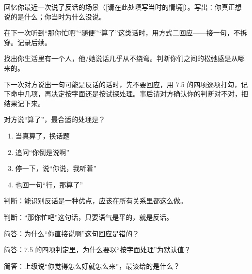 \begin{exercisessec}
\item 回忆你最近一次说了反话的场景（[请在此处填写当时的情境]）。写出：你真正想说的是什么；你当时为什么没说。

\item 在下一次听到“那你忙吧”“随便”“算了”这类话时，用方式二回应——接一句，不拆穿。记录后续。

\item 找出你生活里有一个人，他/她说话几乎从不绕弯。判断你们之间的松弛感是从哪来的。

\item 下一次对方说出一句可能是反话的话时，先不要回应，用 7.5 的四项逐项打勾，记下命中几项，再决定按字面还是按试探处理。事后请对方确认你的判断对不对，把结果记下来。
\end{exercisessec}

\begin{quizsec}
\item 对方说“算了”，最合适的处理是？

\begin{enumerate}[label=\Alph*., leftmargin=2.2em, labelsep=0.6em,
                  itemsep=0.2em, topsep=0.3em, parsep=0.1em]
\item 当真算了，换话题
\item 追问“你倒是说啊”
\item 停一下，说“你说，我听着”
\item 也回一句“行，那算了”
\end{enumerate}

\item 判断：能识别反话是一种优点，应该在所有关系里都这么做。

\item 判断：“那你忙吧”这句话，只要语气是平的，就是反话。

\item 简答：为什么“你直接说啊”这句回应是错的？

\item 简答：7.5 的四项判定里，为什么要以“按字面处理”为默认值？

\item 简答：上级说“你觉得怎么好就怎么来”，最该给的是什么？
\end{quizsec}

